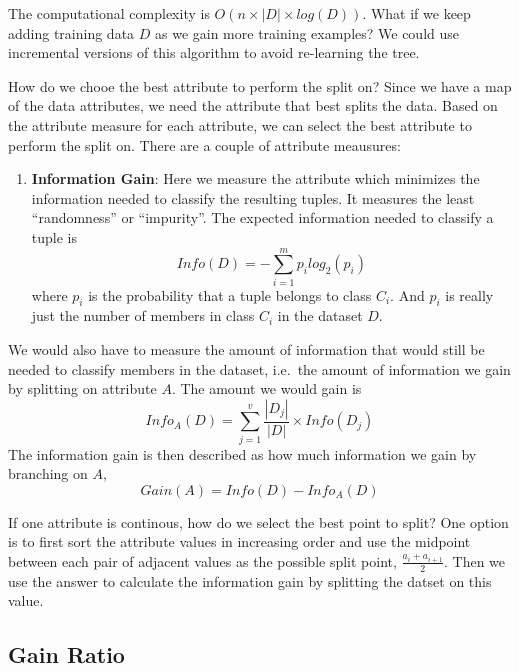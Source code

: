\documentclass[
  paper=a4,
,captions=tableheading
]{scrartcl}
\providecommand{\tightlist}{%
  \setlength{\itemsep}{0pt}\setlength{\parskip}{0pt}}
\begin{document}
The computational complexity is \(O(n\times |D|\times log(D))\). What if
we keep adding training data \(D\) as we gain more training examples? We
could use incremental versions of this algorithm to avoid re-learning
the tree.

How do we chooe the best attribute to perform the split on? Since we
have a map of the data attributes, we need the attribute that best
splits the data. Based on the attribute measure for each attribute, we
can select the best attribute to perform the split on. There are a
couple of attribute meausures:

\begin{enumerate}
\def\labelenumi{\arabic{enumi}.}
\tightlist
\item
  \textbf{Information Gain}: Here we measure the attribute which
  minimizes the information needed to classify the resulting tuples. It
  measures the least ``randomness'' or ``impurity''. The expected
  information needed to classify a tuple is \begin{equation}
   Info(D) = -\sum_{i=1}^{m}p_{i}log_{2}(p_{i})
  \end{equation} where \(p_{i}\) is the probability that a tuple belongs
  to class \(C_{i}\). And \(p_{i}\) is really just the number of members
  in class \(C_{i}\) in the dataset \(D\).
\end{enumerate}

We would also have to measure the amount of information that would still
be needed to classify members in the dataset, i.e.~the amount of
information we gain by splitting on attribute \(A\). The amount we would
gain is \begin{equation}
Info_{A}(D) = \sum_{j=1}^{v} \frac{|D_{j}|}{|D|}\times Info(D_{j})
\end{equation} The information gain is then described as how much
information we gain by branching on \(A\), \begin{equation}
\mathit{Gain}(A) = \mathit{Info}(D) - \mathit{Info_{A}}(D)
\end{equation}

If one attribute is continous, how do we select the best point to split?
One option is to first sort the attribute values in increasing order and
use the midpoint between each pair of adjacent values as the possible
split point, \(\frac{a_{i} + a_{i+1}}{2}\). Then we use the answer to
calculate the information gain by splitting the datset on this value.

\hypertarget{gain-ratio}{%
\subsection{Gain Ratio}\label{gain-ratio}}
\end{document}
